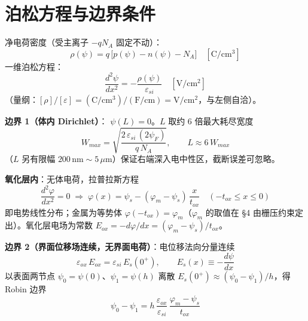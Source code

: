 \documentclass[11pt]{ctexart}
\begin{document}
\section{泊松方程与边界条件}

净电荷密度（受主离子 $-qN_A$ 固定不动）：
\[\rho(\psi)=q\,\big[p(\psi)-n(\psi)-N_A\big]\quad [\mathrm{C/cm^3}]\]
一维泊松方程：
\[\frac{d^2\psi}{dx^2}=-\frac{\rho(\psi)}{\varepsilon_{si}}\quad [\mathrm{V/cm^2}]\]
（量纲：$[\rho]/[\varepsilon]=(\mathrm{C/cm^3})/(\mathrm{F/cm})=\mathrm{V/cm^2}$，与左侧自洽）。

\textbf{边界 1（体内 Dirichlet）}：
\(\psi(L)=0\)。$L$ 取约 6 倍最大耗尽宽度
\[W_{max}=\sqrt{\frac{2\,\varepsilon_{si}\,(2\psi_F)}{q\,N_A}},\qquad L\approx 6\,W_{max}\]
（$L$ 另有限幅 $200\,\mathrm{nm}\sim5\,\mu\mathrm{m}$）保证右端深入电中性区，截断误差可忽略。

\textbf{氧化层内}：无体电荷，拉普拉斯方程
\[\frac{d^2\varphi}{dx^2}=0\;\Rightarrow\;\varphi(x)=\psi_s-(\varphi_m-\psi_s)\,\frac{x}{t_{ox}}\quad(-t_{ox}\le x\le0)\]
即电势线性分布；金属为等势体 $\varphi(-t_{ox})=\varphi_m$（$\varphi_m$ 的取值在 §4 由栅压约束定出）。氧化层电场为常数
\(E_{ox}=-d\varphi/dx=(\varphi_m-\psi_s)/t_{ox}\)。

\textbf{边界 2（界面位移场连续，无界面电荷）}：电位移法向分量连续
\[\varepsilon_{ox}\,E_{ox}=\varepsilon_{si}\,E_s(0^+),\qquad E_s(x)\equiv-\frac{d\psi}{dx}\]
以表面两节点 $\psi_0=\psi(0)$、$\psi_1=\psi(h)$ 离散 $E_s(0^+)\approx(\psi_0-\psi_1)/h$，得 Robin 边界
\[\psi_0-\psi_1=h\,\frac{\varepsilon_{ox}}{\varepsilon_{si}}\,\frac{\varphi_m-\psi_s}{t_{ox}}\]
\end{document}
